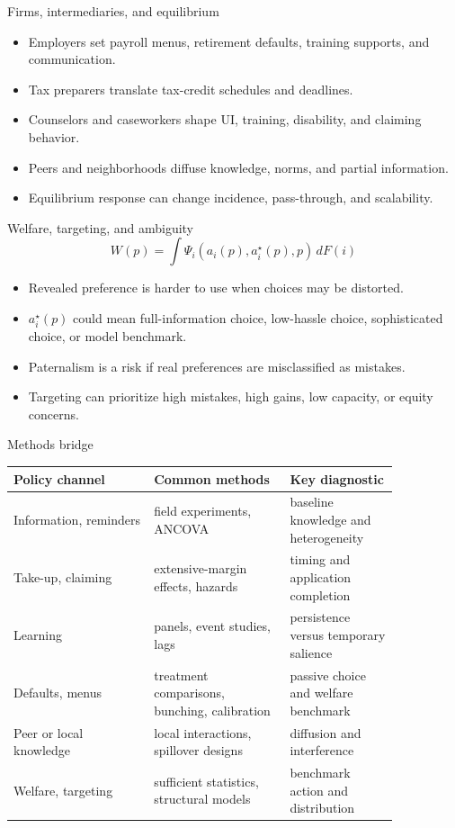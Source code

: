 \documentclass[aspectratio=169,11pt]{beamer}
\begin{document}
\begin{frame}{Firms, intermediaries, and equilibrium}
\begin{itemize}
    \item Employers set payroll menus, retirement defaults, training supports, and communication.
    \item Tax preparers translate tax-credit schedules and deadlines.
    \item Counselors and caseworkers shape UI, training, disability, and claiming behavior.
    \item Peers and neighborhoods diffuse knowledge, norms, and partial information.
    \item Equilibrium response can change incidence, pass-through, and scalability.
\end{itemize}
\end{frame}

\begin{frame}{Welfare, targeting, and ambiguity}
\[
W(p) = \int \Psi_i\!\left(a_i(p), a_i^\star(p), p\right)\, dF(i)
\]

\begin{itemize}
    \item Revealed preference is harder to use when choices may be distorted.
    \item $a_i^\star(p)$ could mean full-information choice, low-hassle choice, sophisticated choice, or model benchmark.
    \item Paternalism is a risk if real preferences are misclassified as mistakes.
    \item Targeting can prioritize high mistakes, high gains, low capacity, or equity concerns.
\end{itemize}
\end{frame}

\begin{frame}{Methods bridge}
\scriptsize
\begin{tabular}{p{0.31\linewidth} p{0.30\linewidth} p{0.24\linewidth}}
\toprule
Policy channel & Common methods & Key diagnostic \\
\midrule
Information, reminders & field experiments, ANCOVA & baseline knowledge and heterogeneity \\
Take-up, claiming & extensive-margin effects, hazards & timing and application completion \\
Learning & panels, event studies, lags & persistence versus temporary salience \\
Defaults, menus & treatment comparisons, bunching, calibration & passive choice and welfare benchmark \\
Peer or local knowledge & local interactions, spillover designs & diffusion and interference \\
Welfare, targeting & sufficient statistics, structural models & benchmark action and distribution \\
\bottomrule
\end{tabular}
\end{frame}
\end{document}
